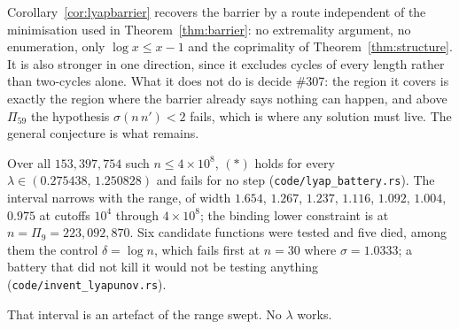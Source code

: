 \documentclass[11pt]{article}
\theoremstyle{definition}
\begin{document}
Corollary~\ref{cor:lyapbarrier} recovers the barrier by a route independent of the minimisation
used in Theorem~\ref{thm:barrier}: no extremality argument, no enumeration, only $\log x\le x-1$ and
the coprimality of Theorem~\ref{thm:structure}. It is also stronger in one direction, since it
excludes cycles of every length rather than two-cycles alone. What it does not do is decide
\#307: the region it covers is exactly the region where the barrier already says nothing can
happen, and above $\Pi_{59}$ the hypothesis $\sigma(n\,n')<2$ fails, which is where any solution
must live. The general conjecture is what remains.

Over all $153{,}397{,}754$ such $n\le4\times10^8$, $(\ast)$ holds for every
$\lambda\in(0.275438,\,1.250828)$ and fails for no step
\textup{(\texttt{code/lyap\_battery.rs})}. The interval narrows with the range, of width
$1.654$, $1.267$, $1.237$, $1.116$, $1.092$, $1.004$, $0.975$ at cutoffs $10^4$ through
$4\times10^8$;
the binding lower constraint is at $n=\Pi_9=223{,}092{,}870$. Six
candidate functions were tested and five died, among them the control $\delta=\log n$, which fails
first at $n=30$ where $\sigma=1.0333$; a battery that did not kill it would not be testing anything
\textup{(\texttt{code/invent\_lyapunov.rs})}.

That interval is an artefact of the range swept. No $\lambda$ works.
\end{document}
